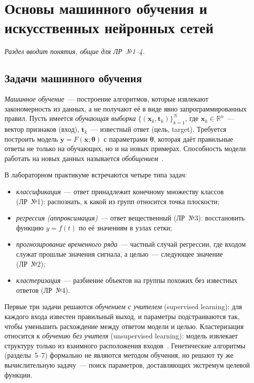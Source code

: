 \section{Основы машинного обучения и искусственных нейронных сетей}
\label{sec:ml}

\noindent\hspace{1.25cm}\emph{Раздел вводит понятия, общие для ЛР~№1--4.}

\subsection{Задачи машинного обучения}

\emph{Машинное обучение}~--- построение алгоритмов, которые извлекают закономерность из данных, а не
получают её в виде явно запрограммированных правил. Пусть имеется \emph{обучающая выборка}
$\{(\mathbf{x}_k, \mathbf{t}_k)\}_{k=1}^{N}$, где $\mathbf{x}_k \in \mathbb{R}^n$~--- вектор признаков
(вход), $\mathbf{t}_k$~--- известный ответ (цель, target). Требуется построить модель $\mathbf{y} =
F(\mathbf{x}; \boldsymbol\theta)$ с параметрами $\boldsymbol\theta$, которая даёт правильные ответы не
только на обучающих, но и на новых примерах. Способность модели работать на новых данных называется
\emph{обобщением}~\cite{golovko2017, haykin2006}.

В лабораторном практикуме встречаются четыре типа задач:
\begin{itemize}
\item \emph{классификация}~--- ответ принадлежит конечному множеству классов (ЛР~№1): распознать, к
какой из групп относится точка плоскости;
\item \emph{регрессия (аппроксимация)}~--- ответ вещественный (ЛР~№3): восстановить функцию $y = f(t)$ по
её значениям в узлах сетки;
\item \emph{прогнозирование временного ряда}~--- частный случай регрессии, где входом служат прошлые
значения сигнала, а целью~--- следующее значение (ЛР~№2);
\item \emph{кластеризация}~--- разбиение объектов на группы похожих без известных ответов (ЛР~№4).
\end{itemize}

Первые три задачи решаются \emph{обучением с учителем} (supervised learning): для каждого входа известен
правильный выход, и параметры подстраиваются так, чтобы уменьшить расхождение между ответом модели и
целью. Кластеризация относится к \emph{обучению без учителя} (unsupervised learning): модель извлекает
структуру только из взаимного расположения входов~\cite{ablameyko2011}. Генетические алгоритмы (разделы~5--7) формально не
являются методом обучения, но решают ту же вычислительную задачу~--- поиск параметров, доставляющих
экстремум целевой функции.

